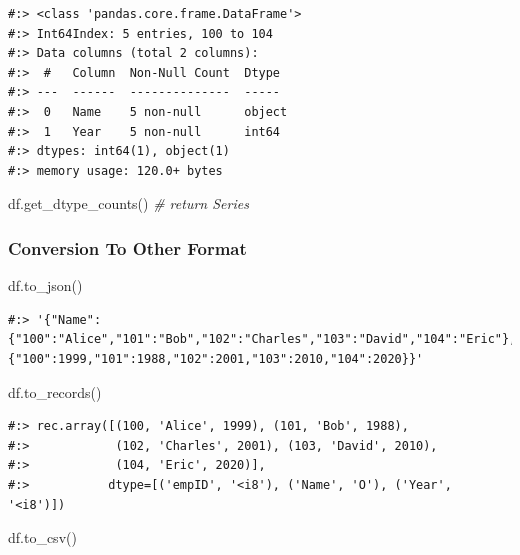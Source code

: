 \documentclass[
]{book}
\newenvironment{Shaded}{\begin{snugshade}}{\end{snugshade}}
\newcommand{\CommentTok}[1]{\textcolor[rgb]{0.37,0.37,0.37}{\textit{#1}}}
\newcommand{\NormalTok}[1]{#1}
\begin{document}
\begin{verbatim}
#:> <class 'pandas.core.frame.DataFrame'>
#:> Int64Index: 5 entries, 100 to 104
#:> Data columns (total 2 columns):
#:>  #   Column  Non-Null Count  Dtype 
#:> ---  ------  --------------  ----- 
#:>  0   Name    5 non-null      object
#:>  1   Year    5 non-null      int64 
#:> dtypes: int64(1), object(1)
#:> memory usage: 120.0+ bytes
\end{verbatim}

\begin{Shaded}
\begin{Highlighting}[]
\NormalTok{df.get_dtype_counts() }\CommentTok{# return Series}
\end{Highlighting}
\end{Shaded}

\hypertarget{conversion-to-other-format}{%
\subsubsection{Conversion To Other Format}\label{conversion-to-other-format}}

\begin{Shaded}
\begin{Highlighting}[]
\NormalTok{df.to_json()}
\end{Highlighting}
\end{Shaded}

\begin{verbatim}
#:> '{"Name":{"100":"Alice","101":"Bob","102":"Charles","103":"David","104":"Eric"},"Year":{"100":1999,"101":1988,"102":2001,"103":2010,"104":2020}}'
\end{verbatim}

\begin{Shaded}
\begin{Highlighting}[]
\NormalTok{df.to_records()}
\end{Highlighting}
\end{Shaded}

\begin{verbatim}
#:> rec.array([(100, 'Alice', 1999), (101, 'Bob', 1988),
#:>            (102, 'Charles', 2001), (103, 'David', 2010),
#:>            (104, 'Eric', 2020)],
#:>           dtype=[('empID', '<i8'), ('Name', 'O'), ('Year', '<i8')])
\end{verbatim}

\begin{Shaded}
\begin{Highlighting}[]
\NormalTok{df.to_csv()}
\end{Highlighting}
\end{Shaded}
\end{document}

